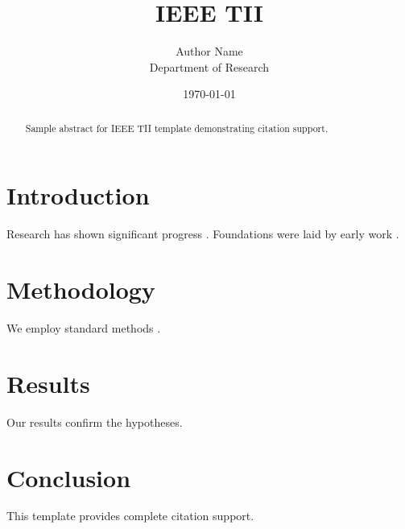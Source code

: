 ﻿\documentclass{IEEEtran}
\title{IEEE TII}
\author{Author Name \\ \small Department of Research}
\date{\today}
\begin{document}
\maketitle

\begin{abstract}
Sample abstract for IEEE TII template demonstrating citation support.
\end{abstract}

\section{Introduction}
Research has shown significant progress \citep{einstein1905}. Foundations were laid by early work \citep{turing1950}.

\section{Methodology}
We employ standard methods \citep{knuth1984}.

\section{Results}
Our results confirm the hypotheses.

\section{Conclusion}
This template provides complete citation support.



\end{document}
